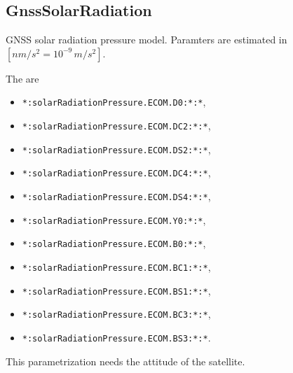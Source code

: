 \subsection{GnssSolarRadiation}\label{parametrizationAccelerationType:gnssSolarRadiation}
GNSS solar radiation pressure model. Paramters are estimated in $[nm/s^2=10^{-9}\,m/s^2]$.

The  are
\begin{itemize}
\item \verb|*:solarRadiationPressure.ECOM.D0:*:*|,
\item \verb|*:solarRadiationPressure.ECOM.DC2:*:*|,
\item \verb|*:solarRadiationPressure.ECOM.DS2:*:*|,
\item \verb|*:solarRadiationPressure.ECOM.DC4:*:*|,
\item \verb|*:solarRadiationPressure.ECOM.DS4:*:*|,
\item \verb|*:solarRadiationPressure.ECOM.Y0:*:*|,
\item \verb|*:solarRadiationPressure.ECOM.B0:*:*|,
\item \verb|*:solarRadiationPressure.ECOM.BC1:*:*|,
\item \verb|*:solarRadiationPressure.ECOM.BS1:*:*|,
\item \verb|*:solarRadiationPressure.ECOM.BC3:*:*|,
\item \verb|*:solarRadiationPressure.ECOM.BS3:*:*|.
\end{itemize}

This parametrization needs the attitude of the satellite.


